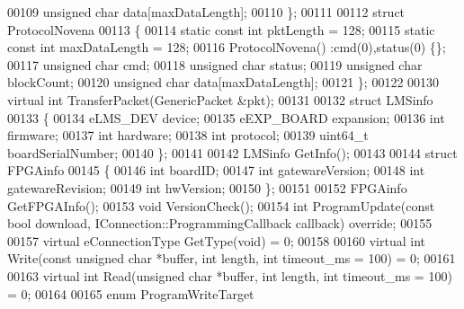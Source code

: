 \begin{DoxyCode}
00109         \textcolor{keywordtype}{unsigned} \textcolor{keywordtype}{char} data[maxDataLength];
00110     \};
00111 
00112     \textcolor{keyword}{struct }ProtocolNovena
00113     \{
00114         \textcolor{keyword}{static} \textcolor{keyword}{const} \textcolor{keywordtype}{int} pktLength = 128;
00115         \textcolor{keyword}{static} \textcolor{keyword}{const} \textcolor{keywordtype}{int} maxDataLength = 128;
00116         ProtocolNovena() :cmd(0),status(0) \{\};
00117         \textcolor{keywordtype}{unsigned} \textcolor{keywordtype}{char} cmd;
00118         \textcolor{keywordtype}{unsigned} \textcolor{keywordtype}{char} status;
00119         \textcolor{keywordtype}{unsigned} \textcolor{keywordtype}{char} blockCount;
00120         \textcolor{keywordtype}{unsigned} \textcolor{keywordtype}{char} data[maxDataLength];
00121     \};
00122 
00130     \textcolor{keyword}{virtual} \textcolor{keywordtype}{int} TransferPacket(GenericPacket &pkt);
00131 
00132     \textcolor{keyword}{struct }LMSinfo
00133     \{
00134         eLMS_DEV device;
00135         eEXP_BOARD expansion;
00136         \textcolor{keywordtype}{int} firmware;
00137         \textcolor{keywordtype}{int} hardware;
00138         \textcolor{keywordtype}{int} protocol;
00139         uint64\_t boardSerialNumber;
00140     \};
00141 
00142     LMSinfo GetInfo();
00143 
00144     \textcolor{keyword}{struct }FPGAinfo
00145     \{
00146         \textcolor{keywordtype}{int} boardID;
00147         \textcolor{keywordtype}{int} gatewareVersion;
00148         \textcolor{keywordtype}{int} gatewareRevision;
00149         \textcolor{keywordtype}{int} hwVersion;
00150     \};
00151 
00152     FPGAinfo GetFPGAInfo();
00153     \textcolor{keywordtype}{void} VersionCheck();
00154     \textcolor{keywordtype}{int} ProgramUpdate(\textcolor{keyword}{const} \textcolor{keywordtype}{bool} download, IConnection::ProgrammingCallback 
      callback) \textcolor{keyword}{override};
00155 
00157     \textcolor{keyword}{virtual} eConnectionType GetType(\textcolor{keywordtype}{void}) = 0;
00158 
00160     \textcolor{keyword}{virtual} \textcolor{keywordtype}{int} Write(\textcolor{keyword}{const} \textcolor{keywordtype}{unsigned} \textcolor{keywordtype}{char} *buffer, \textcolor{keywordtype}{int} length, \textcolor{keywordtype}{int} timeout_ms = 100) = 0;
00161 
00163     \textcolor{keyword}{virtual} \textcolor{keywordtype}{int} Read(\textcolor{keywordtype}{unsigned} \textcolor{keywordtype}{char} *buffer, \textcolor{keywordtype}{int} length, \textcolor{keywordtype}{int} timeout_ms = 100) = 0;
00164 
00165     \textcolor{keyword}{enum} ProgramWriteTarget

\end{DoxyCode}

